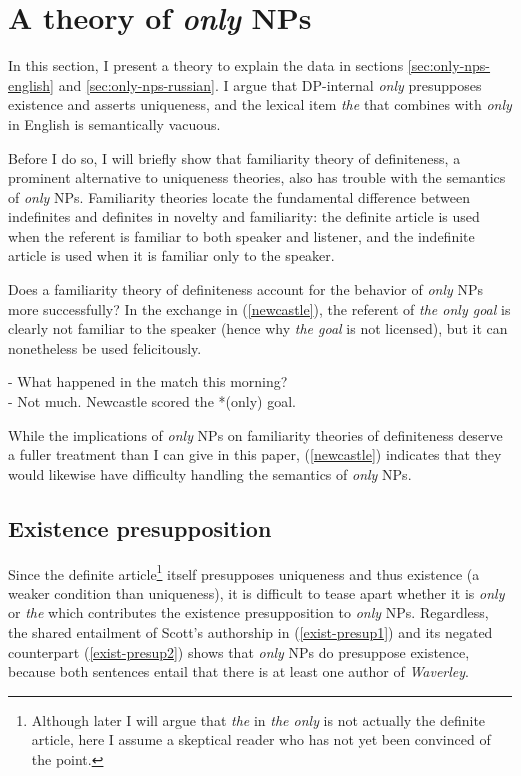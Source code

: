 \section{A theory of \textit{only} NPs \label{sec:my-theory}}
In this section, I present a theory to explain the data in sections \ref{sec:only-nps-english} and \ref{sec:only-nps-russian}. I argue that DP-internal \textit{only} presupposes existence and asserts uniqueness, and the lexical item \textit{the} that combines with \textit{only} in English is semantically vacuous.

Before I do so, I will briefly show that  familiarity theory of definiteness, a prominent alternative to uniqueness theories, also has trouble with the semantics of \textit{only} NPs. Familiarity theories locate the fundamental difference between indefinites and definites in novelty and familiarity: the definite article is used when the referent is familiar to both speaker and listener, and the indefinite article is used when it is familiar only to the speaker.

Does a familiarity theory of definiteness account for the behavior of \textit{only} NPs more successfully? In the exchange in (\ref{newcastle}), the referent of \textit{the only goal} is clearly not familiar to the speaker (hence why \textit{the goal} is not licensed), but it can nonetheless be used felicitously.

\begin{exe}
	\ex \label{newcastle}
	- What happened in the match this morning? \\
	- Not much. Newcastle scored the *(only) goal.
\end{exe}

While the implications of \textit{only} NPs on familiarity theories of definiteness deserve a fuller treatment than I can give in this paper, (\ref{newcastle}) indicates that they would likewise have difficulty handling the semantics of \textit{only} NPs.

\subsection{Existence presupposition}
Since the definite article\footnote{Although later I will argue that \textit{the} in \textit{the only} is not actually the definite article, here I assume a skeptical reader who has not yet been convinced of the point.} itself presupposes uniqueness and thus existence (a weaker condition than uniqueness), it is difficult to tease apart whether it is \textit{only} or \textit{the} which contributes the existence presupposition to \textit{only} NPs. Regardless, the shared entailment of Scott's authorship in (\ref{exist-presup1}) and its negated counterpart (\ref{exist-presup2}) shows that \textit{only} NPs do presuppose existence, because both sentences entail that there is at least one author of \textit{Waverley}.

